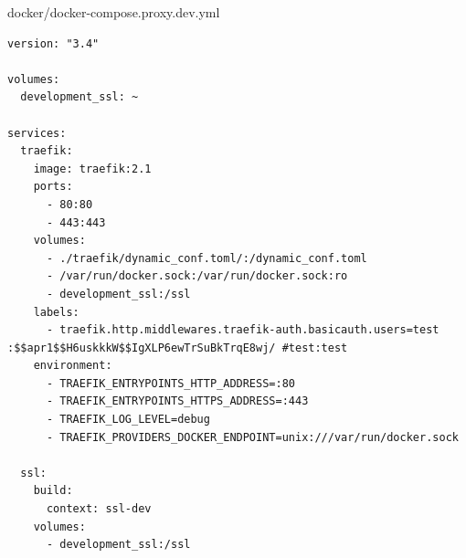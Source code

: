 docker/docker-compose.proxy.dev.yml
\begin{verbatim}
version: "3.4"

volumes:
  development_ssl: ~

services:
  traefik:
    image: traefik:2.1
    ports:
      - 80:80
      - 443:443
    volumes:
      - ./traefik/dynamic_conf.toml/:/dynamic_conf.toml
      - /var/run/docker.sock:/var/run/docker.sock:ro
      - development_ssl:/ssl
    labels:
      - traefik.http.middlewares.traefik-auth.basicauth.users=test :$$apr1$$H6uskkkW$$IgXLP6ewTrSuBkTrqE8wj/ #test:test
    environment:
      - TRAEFIK_ENTRYPOINTS_HTTP_ADDRESS=:80
      - TRAEFIK_ENTRYPOINTS_HTTPS_ADDRESS=:443
      - TRAEFIK_LOG_LEVEL=debug
      - TRAEFIK_PROVIDERS_DOCKER_ENDPOINT=unix:///var/run/docker.sock

  ssl:
    build:
      context: ssl-dev
    volumes:
      - development_ssl:/ssl
\end{verbatim}
